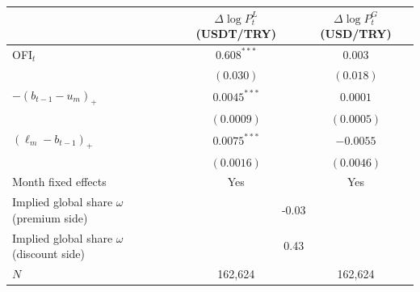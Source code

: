 \begin{tabular}{lcc}
\toprule
 & $\Delta\log P^L_t$ (USDT/TRY) & $\Delta\log P^G_t$ (USD/TRY) \\
\midrule
OFI$_t$ & $0.608^{***}$ & $0.003$ \\
 & $(0.030)$ & $(0.018)$ \\
$-(b_{t-1}-u_m)_+$ & $0.0045^{***}$ & $0.0001$ \\
 & $(0.0009)$ & $(0.0005)$ \\
$(\ell_m-b_{t-1})_+$ & $0.0075^{***}$ & $-0.0055$ \\
 & $(0.0016)$ & $(0.0046)$ \\
\midrule
Month fixed effects & Yes & Yes \\
Implied global share $\omega$ (premium side) & \multicolumn{2}{c}{-0.03} \\
Implied global share $\omega$ (discount side) & \multicolumn{2}{c}{0.43} \\
$N$ & 162,624 & 162,624 \\
\bottomrule
\end{tabular}
